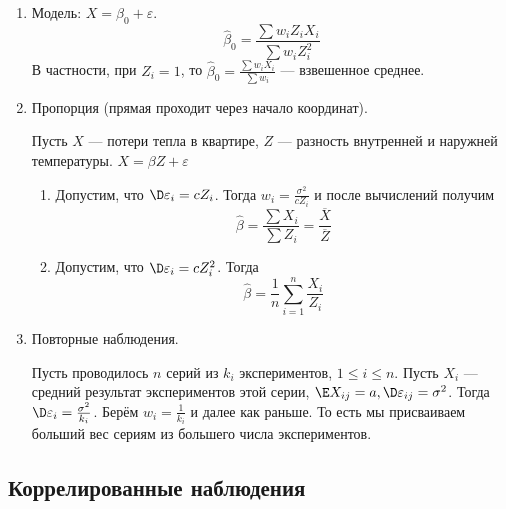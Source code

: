 \begin{example}\itemfix
    \begin{enumerate}
        \item Модель: \(X = \beta_0 + \varepsilon\).
              \[\hat{\beta}_0 = \frac{\sum w_i Z_i X_i}{\sum w_i Z_i^2}\]
              В частности, при \(Z_i = 1\), то \(\hat{\beta}_0 = \frac{\sum w_i X_i}{\sum w_i}\) --- взвешенное среднее.
        \item Пропорция (прямая проходит через начало координат).

              Пусть \(X\) --- потери тепла в квартире, \(Z\) --- разность внутренней и наружней температуры.
              \(X = \beta Z + \varepsilon\)
              \begin{enumerate}
                  \item Допустим, что \(\D \varepsilon_i = c Z_i\). Тогда \(w_i = \frac{\sigma^2}{c Z_i}\) и после вычислений получим
                        \[\hat{\beta} = \frac{\sum X_i}{\sum Z_i} = \frac{\overline{X}}{\overline{Z}}\]
                  \item Допустим, что \(\D \varepsilon_i = c Z_i^2\). Тогда
                        \[\hat{\beta} = \frac{1}{n} \sum_{i=1}^{n} \frac{X_i}{Z_i}\]
              \end{enumerate}
        \item Повторные наблюдения.

              Пусть проводилось \(n\) серий из \(k_i\) экспериментов, \(1 \leq i \leq n\). Пусть \(X_i\) --- средний результат экспериментов этой серии, \(\E X_{ij} = a, \D \varepsilon_{ij} = \sigma^2\). Тогда \(\D \varepsilon_i = \frac{\sigma^2}{k_i}\). Берём \(w_i = \frac{1}{k_i}\) и далее как раньше. То есть мы присваиваем больший вес сериям из большего числа экспериментов.
    \end{enumerate}
\end{example}

\subsection{Коррелированные наблюдения}

